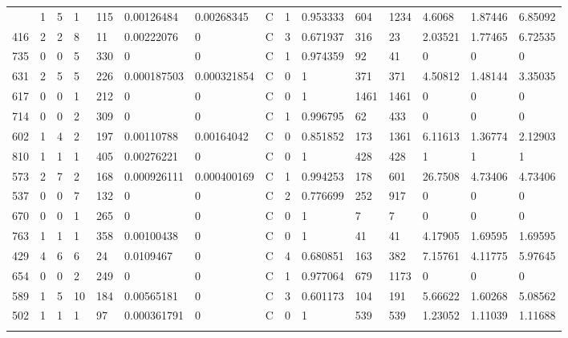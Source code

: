 \begin{latin}
\begin{longtable}{lllllllllllllll}
\begin{comment}
	520 & 1  & 5   & 1  & 115 & 0.00126484     & 0.00268345     & C & 1  & 0.953333 & 604  & 1234 & 4.6068  & 1.87446 & 6.85092 \\
	416 & 2  & 2   & 8  & 11  & 0.00222076     & 0              & C & 3  & 0.671937 & 316  & 23   & 2.03521 & 1.77465 & 6.72535 \\
	735 & 0  & 0   & 5  & 330 & 0              & 0              & C & 1  & 0.974359 & 92   & 41   & 0       & 0       & 0       \\
	631 & 2  & 5   & 5  & 226 & 0.000187503    & 0.000321854    & C & 0  & 1        & 371  & 371  & 4.50812 & 1.48144 & 3.35035 \\
	617 & 0  & 0   & 1  & 212 & 0              & 0              & C & 0  & 1        & 1461 & 1461 & 0       & 0       & 0       \\
	714 & 0  & 0   & 2  & 309 & 0              & 0              & C & 1  & 0.996795 & 62   & 433  & 0       & 0       & 0       \\
	602 & 1  & 4   & 2  & 197 & 0.00110788     & 0.00164042     & C & 0  & 0.851852 & 173  & 1361 & 6.11613 & 1.36774 & 2.12903 \\
	810 & 1  & 1   & 1  & 405 & 0.00276221     & 0              & C & 0  & 1        & 428  & 428  & 1       & 1       & 1       \\
	573 & 2  & 7   & 2  & 168 & 0.000926111    & 0.000400169    & C & 1  & 0.994253 & 178  & 601  & 26.7508 & 4.73406 & 4.73406 \\
	537 & 0  & 0   & 7  & 132 & 0              & 0              & C & 2  & 0.776699 & 252  & 917  & 0       & 0       & 0       \\
	670 & 0  & 0   & 1  & 265 & 0              & 0              & C & 0  & 1        & 7    & 7    & 0       & 0       & 0       \\
	763 & 1  & 1   & 1  & 358 & 0.00100438     & 0              & C & 0  & 1        & 41   & 41   & 4.17905 & 1.69595 & 1.69595 \\
	429 & 4  & 6   & 6  & 24  & 0.0109467      & 0              & C & 4  & 0.680851 & 163  & 382  & 7.15761 & 4.11775 & 5.97645 \\
	654 & 0  & 0   & 2  & 249 & 0              & 0              & C & 1  & 0.977064 & 679  & 1173 & 0       & 0       & 0       \\
	589 & 1  & 5   & 10 & 184 & 0.00565181     & 0              & C & 3  & 0.601173 & 104  & 191  & 5.66622 & 1.60268 & 5.08562 \\
	502 & 1  & 1   & 1  & 97  & 0.000361791    & 0              & C & 0  & 1        & 539  & 539  & 1.23052 & 1.11039 & 1.11688 \\

\end{comment}
\end{longtable}
\end{latin}
